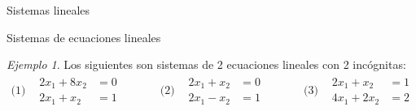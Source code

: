 \documentclass[a4paper,12pt,twoside,spanish,reqno]{amsbook}
\numberwithin{equation}{section}
\theoremstyle{definition}
\theoremstyle{remark}
\newtheorem*{ejemplo*}{Ejemplo}
\begin{document}
\begin{chapter}{Sistemas lineales}
\begin{section}{Sistemas de ecuaciones lineales}
            \begin{ejemplo*}
                Los siguientes son sistemas de 2 ecuaciones lineales con 2 incógnitas:
                \begin{equation*}
                \begin{matrix}
                \text{(1)} & 
                \begin{matrix}
                2x_1 + 8x_2 &= 0 &  \\
                2x_1 + x_2 &=  1& 
                \end{matrix} &\quad&
                \text{(2)} & 
                \begin{matrix}
                2x_1 + x_2 &= 0 &  \\
                2x_1 - x_2 &=  1& 
                \end{matrix} &\quad&
                \text{(3)} & 
                \begin{matrix}
                2x_1 + x_2 &= 1 &  \\
                4x_1 +2 x_2 &=  2& 
                \end{matrix} 
                \end{matrix}
                \end{equation*}
            \end{ejemplo*} 
            

\end{section}
\end{chapter}
\end{document}
